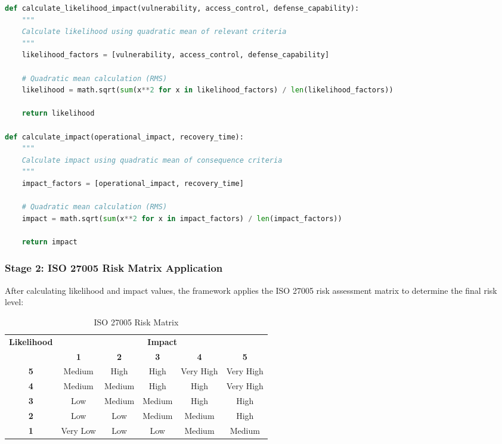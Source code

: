 \documentclass[binding=0.6cm]{sapthesis}
\begin{document}
\begin{lstlisting}[language=Python, caption=Likelihood and Impact Calculation]
def calculate_likelihood_impact(vulnerability, access_control, defense_capability):
    """
    Calculate likelihood using quadratic mean of relevant criteria
    """
    likelihood_factors = [vulnerability, access_control, defense_capability]
    
    # Quadratic mean calculation (RMS)
    likelihood = math.sqrt(sum(x**2 for x in likelihood_factors) / len(likelihood_factors))
    
    return likelihood

def calculate_impact(operational_impact, recovery_time):
    """
    Calculate impact using quadratic mean of consequence criteria
    """
    impact_factors = [operational_impact, recovery_time]
    
    # Quadratic mean calculation (RMS)
    impact = math.sqrt(sum(x**2 for x in impact_factors) / len(impact_factors))
    
    return impact
\end{lstlisting}

\subsubsection{Stage 2: ISO 27005 Risk Matrix Application}

After calculating likelihood and impact values, the framework applies the ISO 27005 risk assessment matrix to determine the final risk level:

\begin{table}[H]
\centering
\caption{ISO 27005 Risk Matrix}
\begin{tabular}{|c|c|c|c|c|c|}
\hline
\multirow{2}{*}{\textbf{Likelihood}} & \multicolumn{5}{c|}{\textbf{Impact}} \\ \cline{2-6}
& \textbf{1} & \textbf{2} & \textbf{3} & \textbf{4} & \textbf{5} \\ \hline
\textbf{5} & Medium & High & High & Very High & Very High \\ \hline
\textbf{4} & Medium & Medium & High & High & Very High \\ \hline
\textbf{3} & Low & Medium & Medium & High & High \\ \hline
\textbf{2} & Low & Low & Medium & Medium & High \\ \hline
\textbf{1} & Very Low & Low & Low & Medium & Medium \\ \hline
\end{tabular}
\end{table}
\end{document}

